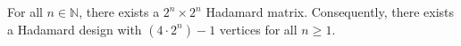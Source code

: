 For all $n \in \mathbb{N}$, there exists a $2^n \times 2^n$ Hadamard matrix. Consequently, there exists a Hadamard design with $(4 \cdot 2^n) - 1$ vertices for all $n \geq 1$.
